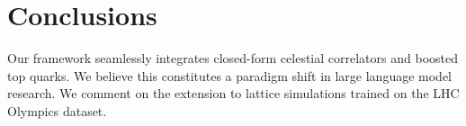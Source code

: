 \section{Conclusions}\label{sec:conclusions}

Our framework seamlessly integrates closed-form celestial correlators
and boosted top quarks. We believe this constitutes a paradigm shift in
large language model research. We comment on the extension to lattice
simulations trained on the LHC Olympics dataset.

